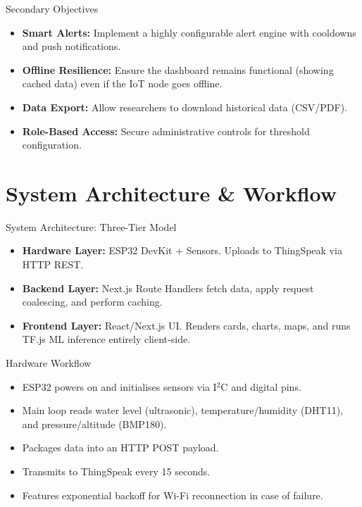 \documentclass[aspectratio=169]{beamer}
\begin{document}
\begin{frame}{Secondary Objectives}
  \begin{itemize}
    \item \textbf{Smart Alerts:} Implement a highly configurable alert engine with cooldowns and push notifications.
    \item \textbf{Offline Resilience:} Ensure the dashboard remains functional (showing cached data) even if the IoT node goes offline.
    \item \textbf{Data Export:} Allow researchers to download historical data (CSV/PDF).
    \item \textbf{Role-Based Access:} Secure administrative controls for threshold configuration.
  \end{itemize}
\end{frame}

\section{System Architecture \& Workflow}

\begin{frame}{System Architecture: Three-Tier Model}
  \begin{itemize}
    \item \textbf{Hardware Layer:} ESP32 DevKit + Sensors. Uploads to ThingSpeak via HTTP REST.
    \item \textbf{Backend Layer:} Next.js Route Handlers fetch data, apply request coalescing, and perform caching.
    \item \textbf{Frontend Layer:} React/Next.js UI. Renders cards, charts, maps, and runs TF.js ML inference entirely client-side.
  \end{itemize}
\end{frame}

\begin{frame}{Hardware Workflow}
  \begin{itemize}
    \item ESP32 powers on and initialises sensors via I$^2$C and digital pins.
    \item Main loop reads water level (ultrasonic), temperature/humidity (DHT11), and pressure/altitude (BMP180).
    \item Packages data into an HTTP POST payload.
    \item Transmits to ThingSpeak every 15 seconds.
    \item Features exponential backoff for Wi-Fi reconnection in case of failure.
  \end{itemize}
\end{frame}
\end{document}
